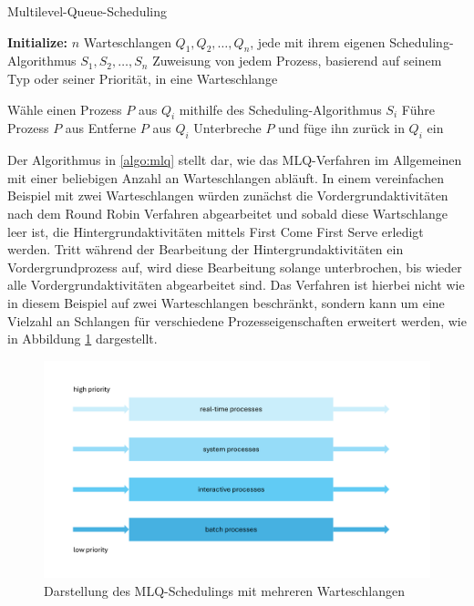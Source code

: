 \begin{algorithm}
	\caption{Multilevel-Queue-Scheduling} \label{algo:mlq}
	\begin{algorithmic}[1]
		
		\State \textbf{Initialize:} $n$ Warteschlangen $Q_1, Q_2, \ldots, Q_n$, jede mit ihrem eigenen Scheduling-Algorithmus $S_1, S_2, \ldots, S_n$
		\State Zuweisung von jedem Prozess, basierend auf seinem Typ oder seiner Priorität, in eine Warteschlange
		
		\State Wähle einen Prozess $P$ aus $Q_i$ mithilfe des Scheduling-Algorithmus $S_i$
		\State Führe Prozess $P$ aus
		\State Entferne $P$ aus $Q_i$
		\State Unterbreche $P$ und füge ihn zurück in $Q_i$ ein
		\EndIf
		\EndIf
		\EndFor
		\EndWhile
		
	\end{algorithmic}
\end{algorithm}

Der Algorithmus in \ref{algo:mlq} stellt dar, wie das \ac{MLQ}-Verfahren im Allgemeinen mit einer beliebigen Anzahl an Warteschlangen abläuft.
In einem vereinfachen Beispiel mit zwei Warteschlangen würden zunächst die Vordergrundaktivitäten nach dem Round Robin Verfahren abgearbeitet und sobald diese Wartschlange leer ist, die Hintergrundaktivitäten mittels First Come First Serve erledigt werden. Tritt während der Bearbeitung der Hintergrundaktivitäten ein Vordergrundprozess auf, wird diese Bearbeitung solange unterbrochen, bis wieder alle Vordergrundaktivitäten abgearbeitet sind.
Das Verfahren ist hierbei nicht wie in diesem Beispiel auf zwei Warteschlangen beschränkt, sondern kann um eine Vielzahl an Schlangen für verschiedene Prozesseigenschaften erweitert werden, wie in Abbildung \ref{fig:mlq_queues} dargestellt.
\begin{figure}[ht]
	\centering
	\includegraphics[width=\linewidth]{img/mlq.pdf}
	\caption{Darstellung des \ac{MLQ}-Schedulings mit mehreren Warteschlangen \cite[S.215]{Silberschatz.2019}} 
	\label{fig:mlq_queues} 
\end{figure}

